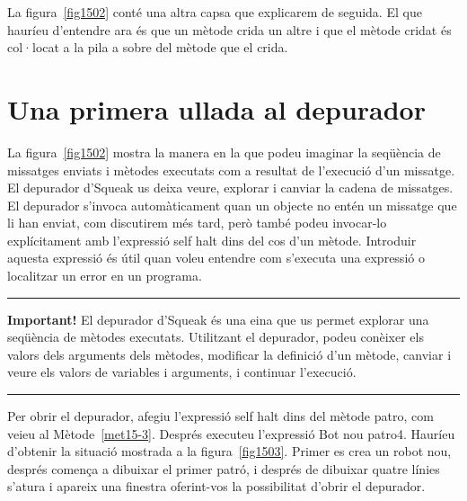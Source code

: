 La figura~\ref{fig1502} conté una altra capsa que explicarem de seguida. El que hauríeu d'entendre ara és que un mètode crida un altre i que el mètode cridat és col·locat a la pila a sobre del mètode que el crida.   

\section{Una primera ullada al depurador}
La figura~\ref{fig1502} mostra la manera en la que podeu imaginar la seqüència de missatges enviats i mètodes executats com a resultat de l'execució d'un missatge. El depurador d'Squeak us deixa veure, explorar i canviar la cadena de missatges. El depurador s'invoca automàticament quan un objecte no entén un missatge que li han enviat, com discutirem més tard, però també podeu invocar-lo explícitament amb l'expressió \textsf{self halt} dins del cos d'un mètode. Introduir aquesta expressió és útil quan voleu entendre com s'executa una expressió o localitzar un error en un programa.
\noindent
\rule{\textwidth}{2pt}
\noindent
\textbf{Important!} El depurador d'Squeak és una eina que us permet explorar una seqüència de mètodes executats. Utilitzant el depurador, podeu conèixer els valors dels arguments dels mètodes, modificar la definició d'un mètode, canviar i veure els valors de variables i arguments, i continuar l'execució.\\
\noindent
\rule{\textwidth}{2pt}
\vspace*{1mm}

Per obrir el depurador, afegiu l'expressió \textsf{self halt} dins del mètode \textsf{patro}, com veieu al Mètode~\ref{met15-3}. Després executeu l'expressió \textsf{Bot nou patro4}. Hauríeu d'obtenir la situació mostrada a la figura~\ref{fig1503}. Primer es crea un robot nou, després comença a dibuixar el primer patró, i després de dibuixar quatre línies s'atura i apareix una finestra oferint-vos la possibilitat d'obrir el depurador.

